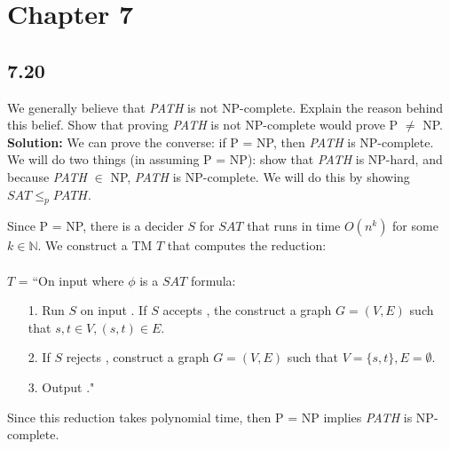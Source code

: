 \section{Chapter 7}

\subsection*{7.20} We generally believe that \emph{PATH} is not NP-complete. Explain the reason behind this belief. Show that proving \emph{PATH} is not NP-complete would prove P $\ne$ NP.
\\
\textbf{Solution:} We can prove the converse: if P = NP, then \emph{PATH} is NP-complete. We will do two things (in assuming P = NP): show that \emph{PATH} is NP-hard, and because \emph{PATH} $\in$ NP, \emph{PATH} is NP-complete. We will do this by showing $SAT \le_p PATH$.

\par Since P = NP, there is a decider $S$ for $SAT$ that runs in time $O(n^k)$ for some $k \in \mathbb{N}$. We construct a TM $T$ that computes the reduction:
\\ \\
$T$ = ``On input \angles{\phi} where $\phi$ is a $SAT$ formula:
\begin{enumerate}
\item[1.]Run $S$ on input \angles{\phi}. If $S$ accepts \angles{\phi}, the construct a graph $G = (V, E)$ such that $s, t \in V, (s, t) \in E$.
\item[2.]If $S$ rejects \angles{\phi}, construct a graph $G = (V, E)$ such that $V = \{s, t\}, E = \emptyset$.
\item[3.]Output ."
\end{enumerate}
Since this reduction takes polynomial time, then P = NP implies \emph{PATH} is NP-complete.